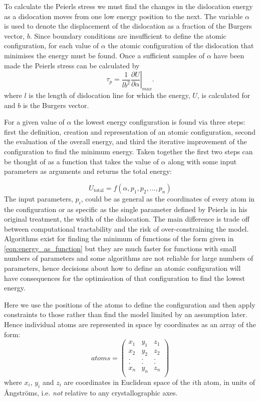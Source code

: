 To calculate the Peierls stress we must find the changes in the dislocation energy as a dislocation moves from one low energy position to the next. The variable $\alpha$ is used to denote the  displacement of the dislocation as a fraction of the Burgers vector, $b$. Since boundary conditions are insufficient to define the atomic configuration, for each value of $\alpha$ the atomic configuration of the dislocation that minimises the energy must be found. Once a sufficient samples of $\alpha$ have been made the Peierls stress can be calculated by 
\begin{equation}
\tau_p = \frac{1}{lb^2}   \left. \frac{\partial U}{\partial \alpha} \right|_{max} .
\end{equation}
where $l$ is the length of dislocation line for which the energy, $U$, is calculated for and $b$ is the Burgers vector.

For a given value of $\alpha$ the lowest energy configuration is found via three steps: first the definition, creation and representation of an atomic configuration, second the evaluation of the overall energy, and third the iterative improvement of the configuration to find the minimum energy. Taken together the first two steps can be thought of as a function that takes the value of $\alpha$ along with some input parameters as arguments and returns the total energy:

\begin{equation}
U_{\text{total}} = f(\alpha, p_1, p_2,...,p_n )
\label{eqn:energy_as_function}
\end{equation}
The input parameters, $p_i$, could be as general as the coordinates of every atom in the configuration or as specific as the single parameter defined by Peierls in his original treatment, the width of the dislocation. The main difference is trade off between computational tractability and the risk of over-constraining the model. Algorithms exist for finding the minimum of functions of the form given in \autoref{eqn:energy_as_function} but they are much faster for functions with small numbers of parameters and some algorithms are not reliable for large numbers of parameters, hence decisions about how to define an atomic configuration will have consequences for the optimisation of that configuration to find the lowest energy.

Here we use the positions of the atoms to define the configuration and then apply constraints to those rather than find the model limited by an assumption later. Hence individual atoms are represented in space by coordinates as an array of the form:
$$ atoms = \begin{pmatrix}
x_1 & y_1 & z_1  \\
x_2 & y_2 & z_2  \\
.   &.    &.     \\
.   &.    &.     \\
x_n & y_n & z_n  \\
\end{pmatrix}
$$
where $x_i$, $y_i$ and $z_i$ are coordinates in Euclidean space of the $i$th atom, in units of \r{A}ngstr\"{o}ms, i.e. \emph{not} relative to any crystallographic axes.

